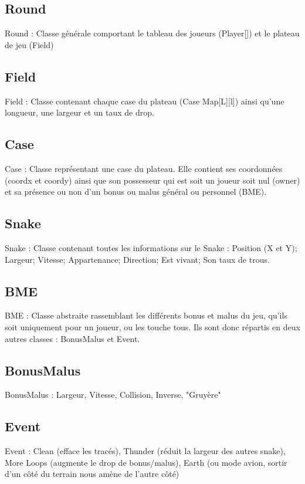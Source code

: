 \documentclass[a4paper,11pt,final]{article}
\begin{document}
\subsection{Round}	  
	Round : Classe générale comportant le tableau des joueurs (Player[]) et le plateau de jeu (Field)

\subsection{Field}	  
	Field : Classe contenant chaque case du plateau (Case Map[L][l]) ainsi qu’une longueur, une largeur et un taux de drop.

\subsection{Case}	  
Case : Classe représentant une case du plateau. Elle contient ses coordonnées (coordx et coordy) ainsi que son possesseur qui est soit un joueur soit nul (owner) et sa présence ou non d’un bonus ou malus général ou personnel (BME).

\subsection{Snake}	  
Snake : Classe contenant toutes les informations sur le Snake : 
Position (X et Y);
Largeur;
Vitesse;
Appartenance;
Direction;
Est vivant;
Son taux de trous.

\subsection{BME}	  
BME : Classe abstraite rassemblant les différents bonus et malus du jeu, qu’ils soit uniquement pour un joueur, ou les touche tous. Ils sont donc répartis en deux autres classes : BonusMalus et Event.

\subsection{BonusMalus}	  
BonusMalus : Largeur, Vitesse, Collision, Inverse, "Gruyère"

\subsection{Event}	  
Event : Clean (efface les tracés), Thunder (réduit la largeur des autres snake), More Loops (augmente le drop de bonus/malus), Earth (ou mode avion, sortir d'un côté du terrain nous amène de l'autre côté)
\end{document}
